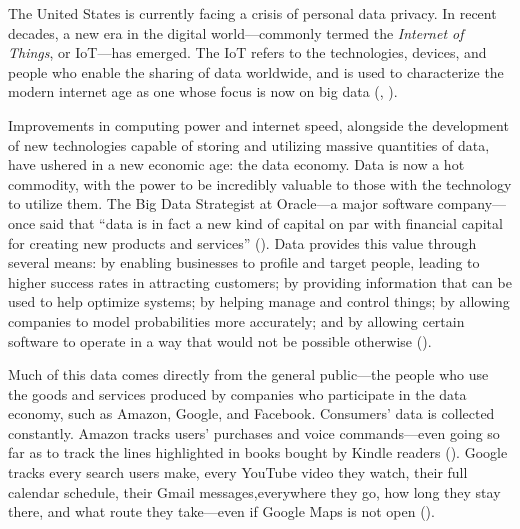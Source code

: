 \documentclass[water,article,submit,moreauthors,pdftex]{mdpi}
\begin{document}

The United States is currently facing a crisis of personal data privacy.
In recent decades, a new era in the digital world---commonly termed the
\emph{Internet of Things}, or IoT---has emerged. The IoT refers to the
technologies, devices, and people who enable the sharing of data
worldwide, and is used to characterize the modern internet age as one
whose focus is now on big data (\citet{atzori2010internet},
\citet{elvy2018commodifying}).

Improvements in computing power and internet speed, alongside the
development of new technologies capable of storing and utilizing massive
quantities of data, have ushered in a new economic age: the data
economy. Data is now a hot commodity, with the power to be incredibly
valuable to those with the technology to utilize them. The Big Data
Strategist at Oracle---a major software company---once said that ``data
is in fact a new kind of capital on par with financial capital for
creating new products and services'' (\citet{oracle_quote}). Data
provides this value through several means: by enabling businesses to
profile and target people, leading to higher success rates in attracting
customers; by providing information that can be used to help optimize
systems; by helping manage and control things; by allowing companies to
model probabilities more accurately; and by allowing certain software to
operate in a way that would not be possible otherwise
(\citet{sadowski2019data}).

Much of this data comes directly from the general public---the people
who use the goods and services produced by companies who participate in
the data economy, such as Amazon, Google, and Facebook. Consumers' data
is collected constantly. Amazon tracks users' purchases and voice
commands---even going so far as to track the lines highlighted in books
bought by Kindle readers (\citet{amazon-kindle}). Google tracks every
search users make, every YouTube video they watch, their full calendar
schedule, their Gmail messages,everywhere they go, how long they stay
there, and what route they take---even if Google Maps is not open
(\citet{google-safety}).
\end{document}

